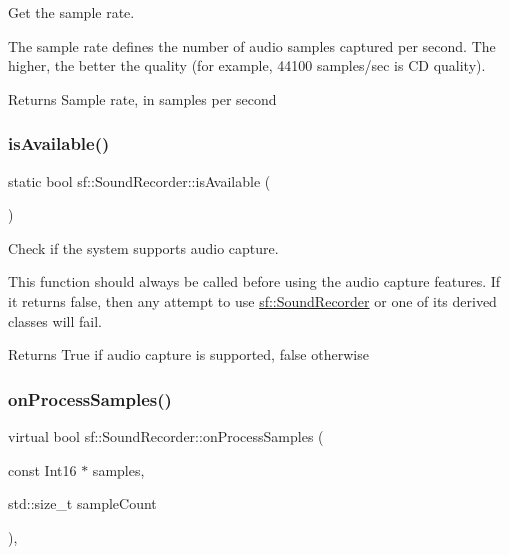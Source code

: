 Get the sample rate. 

The sample rate defines the number of audio samples captured per second. The higher, the better the quality (for example, 44100 samples/sec is CD quality).

\begin{DoxyReturn}{Returns}
Sample rate, in samples per second \begin{DoxyVerb}\end{DoxyVerb}
 
\end{DoxyReturn}
\mbox{\label{classsf_1_1_sound_recorder_aab2bd0fee9e48d6cfd449b1cb078ce5a}} 
\subsubsection{\texorpdfstring{isAvailable()}{isAvailable()}}
{\footnotesize\ttfamily static bool sf\+::\+Sound\+Recorder\+::is\+Available (\begin{DoxyParamCaption}{ }\end{DoxyParamCaption})\hspace{0.3cm}{\ttfamily [static]}}



Check if the system supports audio capture. 

This function should always be called before using the audio capture features. If it returns false, then any attempt to use \mbox{\hyperlink{classsf_1_1_sound_recorder}{sf\+::\+Sound\+Recorder}} or one of its derived classes will fail.

\begin{DoxyReturn}{Returns}
True if audio capture is supported, false otherwise \begin{DoxyVerb}\end{DoxyVerb}
 
\end{DoxyReturn}
\mbox{\label{classsf_1_1_sound_recorder_a2670124cbe7a87c7e46b4840807f4fd7}} 
\subsubsection{\texorpdfstring{onProcessSamples()}{onProcessSamples()}}
{\footnotesize\ttfamily virtual bool sf\+::\+Sound\+Recorder\+::on\+Process\+Samples (\begin{DoxyParamCaption}\item[{const Int16 $\ast$}]{samples,  }\item[{std\+::size\+\_\+t}]{sample\+Count }\end{DoxyParamCaption})\hspace{0.3cm}{\ttfamily [protected]}, {}}




